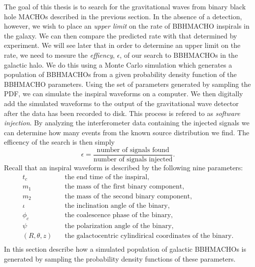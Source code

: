 The goal of this thesis is to search for the gravitational waves from binary
black hole MACHOs described in the previous section. In the absence of a
detection, however, we wish to place an \emph{upper limit} on the rate of
BBHMACHO inspirals in the galaxy. We can then compare the predicted rate
with that determined by experiment. We will see later that in order to
determine an upper limit on the rate, we need to mesure the \emph{effiency},
$\epsilon$, of our search to BBHMACHOs in the galactic halo. We do this
using a Monte Carlo simulation which generates a population of BBHMACHOs from
a given probability density function of the BBHMACHO parameters. Using the
set of parameters generated by sampling the PDF, we can simulate the inspiral
waveforms on a computer. We then digitally add the simulated waveforms to the
output of the gravitational wave detector after the data has been recorded to
disk. This process is refered to as \emph{software injection}. By analyzing
the interferometer data containing the injected signals we can determine how
many events from the known source distribution we find. The efficency of the
search is then simply
\begin{equation}
\epsilon = 
\frac{\textrm{number of signals found}}{\textrm{number of signals injected}}.
\end{equation}
Recall that an inspiral waveform is described by the following nine 
parameters:
\begin{equation*}
\begin{split}
t_c &\quad \textrm{the end time of the inspiral}, \\
m_1 &\quad \textrm{the mass of the first binary component}, \\
m_2 &\quad \textrm{the mass of the second binary component}, \\
\iota &\quad \textrm{the inclination angle of the binary}, \\
\phi_c &\quad \textrm{the coalescence phase of the binary}, \\
\psi &\quad \textrm{the polarization angle of the binary}, \\
(R,\theta,z) &\quad \textrm{the galactocentric cylindirical coordinates of the
binary}.\\
\end{split}
\end{equation*}
In this section describe how a simulated population of galactic BBHMACHOs is
generated by sampling the probability density functions of these parameters.

